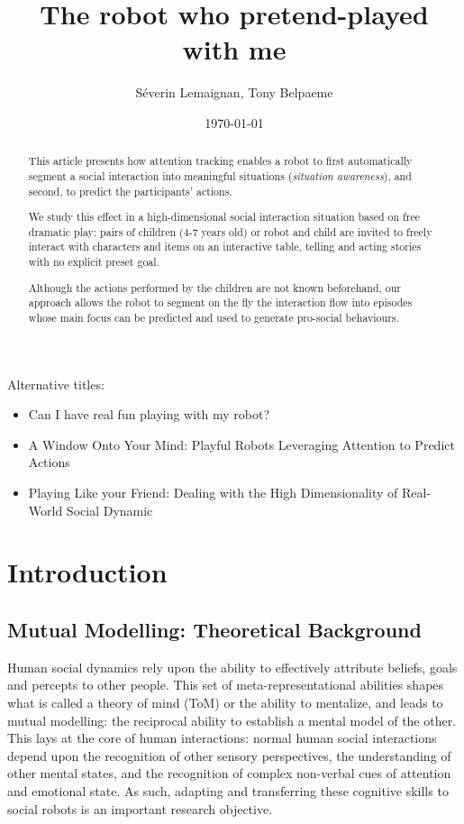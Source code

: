 \documentclass[a4paper]{article}
\title{The robot who pretend-played with me}
\author{Séverin Lemaignan, Tony Belpaeme}
\date{\today}
\begin{document}
\maketitle

Alternative titles:

\begin{itemize}
    \item Can I have real fun playing with my robot?
    \item A Window Onto Your Mind: Playful Robots Leveraging Attention to
        Predict Actions
    \item Playing Like your Friend: Dealing with the High Dimensionality of
        Real-World Social Dynamic

\end{itemize}

\begin{abstract}

    This article presents how attention tracking enables a robot to first automatically segment
    a social interaction into meaningful situations (\emph{situation awareness}), and
    second, to predict the participants' actions.

    We study this effect in a high-dimensional social interaction situation based on
    free dramatic play: pairs of children (4-7 years old) or robot and child are
    invited to freely interact with characters and items on an interactive
    table, telling and acting stories with no explicit preset goal.
    
    Although the actions performed by the children are not known beforehand, our
    approach allows the robot to segment on the fly the interaction flow into
    episodes whose main focus can be predicted and used to generate pro-social
    behaviours.

\end{abstract}


\section{Introduction}

\subsection{Mutual Modelling: Theoretical Background}

Human social dynamics rely upon the ability to effectively attribute beliefs,
goals and percepts to other people. This set of meta-representational abilities
shapes what is called a theory of mind (ToM) or the ability to mentalize, and
leads to mutual modelling: the reciprocal ability to establish a mental model of
the other. This lays at the core of human interactions: normal human social
interactions depend upon the recognition of other sensory perspectives, the
understanding of other mental states, and the recognition of complex non-verbal
cues of attention and emotional state. As such, adapting and transferring these
cognitive skills to social robots is an important research objective.
\end{document}
